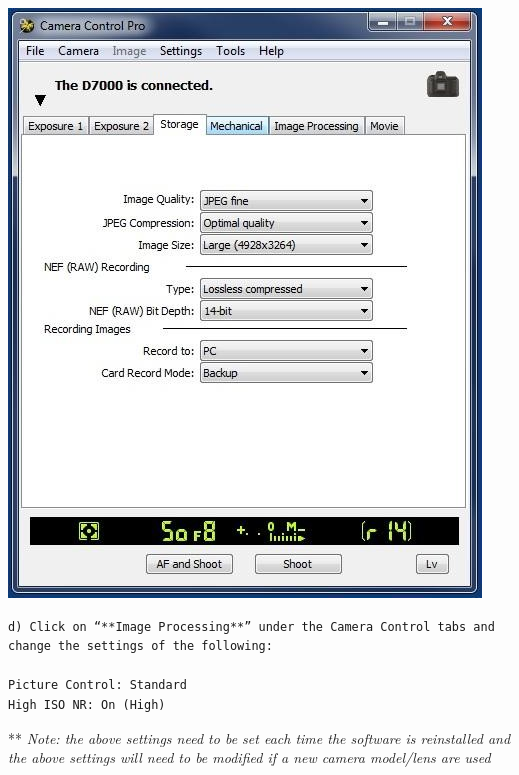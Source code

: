 \documentclass[]{book}
\begin{document}
\includegraphics{images/Camera5.jpg}

\begin{verbatim}
d) Click on “**Image Processing**” under the Camera Control tabs and change the settings of the following:  

Picture Control: Standard
High ISO NR: On (High) 
\end{verbatim}

** \emph{Note: the above settings need to be set each time the software is reinstalled and the above settings will need to be modified if a new camera model/lens are used}
\end{document}
